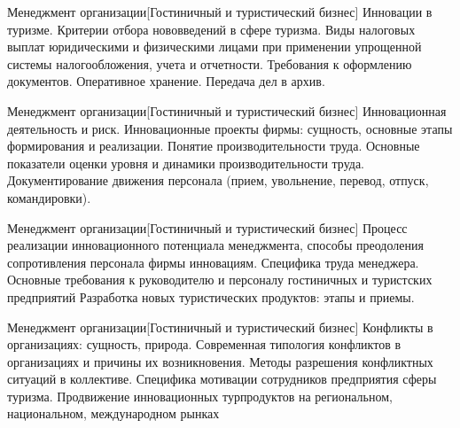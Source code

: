 \documentclass[
	11pt,
	a4paper,
	]
	{article}
\begin{document}
\vfill



\begin{minipage}[t][\miniH]{\miniL}\centering
	 {Менеджмент организации}[Гостиничный и туристический бизнес]
		{
			Инновации в туризме. Критерии отбора нововведений в сфере туризма.
		}{
			Виды налоговых выплат юридическими и физическими лицами при применении упрощенной системы налогообложения, учета и отчетности.
		}{
			Требования к оформлению документов. Оперативное хранение. Передача дел в архив.
		}
	\lowGE
\end{minipage}

\vfill



\begin{minipage}[t][\miniH]{\miniL}\centering
	 {Менеджмент организации}[Гостиничный и туристический бизнес]
		{
			Инновационная деятельность и риск. Инновационные проекты фирмы: сущность, основные этапы формирования и реализации.
		}{
			Понятие производительности труда. Основные показатели оценки уровня и динамики производительности труда.
		}{
			Документирование движения персонала (прием, увольнение, перевод, отпуск, командировки).
		}
	\lowGE
\end{minipage}





\begin{minipage}[t][\miniH]{\miniL}\centering
	 {Менеджмент организации}[Гостиничный и туристический бизнес]
		{
			Процесс реализации инновационного потенциала менеджмента, способы преодоления сопротивления персонала фирмы инновациям.
		}{
			Специфика труда менеджера. Основные требования к руководителю и персоналу гостиничных и туристских предприятий
		}{
			Разработка новых туристических продуктов: этапы и приемы.
		}
	\lowGE
\end{minipage}

\vfill



\begin{minipage}[t][\miniH]{\miniL}\centering
	 {Менеджмент организации}[Гостиничный и туристический бизнес]
		{
			Конфликты в организациях: сущность, природа. Современная типология конфликтов в организациях и причины их возникновения. Методы разрешения конфликтных ситуаций в коллективе.
		}{
			Специфика мотивации сотрудников предприятия сферы туризма.
		}{
			Продвижение инновационных турпродуктов на региональном, национальном, международном рынках
		}
	\lowGE
\end{minipage}
\end{document}
